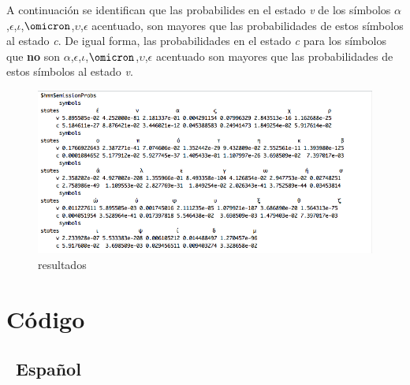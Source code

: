 \documentclass[]{article}
\begin{document}
A continuación se identifican que las probabilides en el estado \emph{v}
de los símbolos
\(\alpha\),\(\epsilon\),\(\iota\),\(\omicron\),\(\upsilon\),\(\epsilon\)
acentuado, son mayores que las probabilidades de estos símbolos al
estado \emph{c}. De igual forma, las probabilidades en el estado
\emph{c} para los símbolos que \textbf{no} son
\(\alpha\),\(\epsilon\),\(\iota\),\(\omicron\),\(\upsilon\),\(\epsilon\)
acentuado son mayores que las probabilidades de estos símbolos al estado
\emph{v}.

\begin{figure}[htbp]
\centering
\includegraphics{salida_vocales_griego.png}
\caption{resultados}
\end{figure}

\pagebreak

\section{Código}\label{codigo}

\subsection{~Español}\label{espanol}
\end{document}
